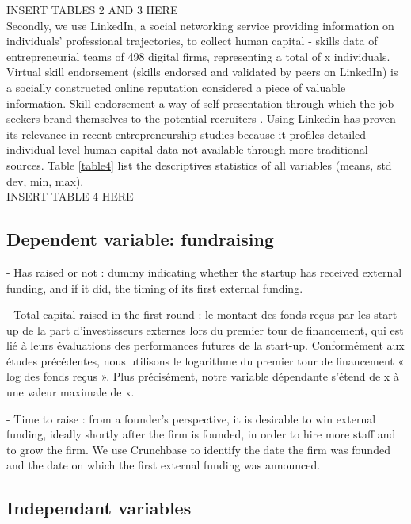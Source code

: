 \documentclass[12pt]{article}
\begin{document}
INSERT TABLES 2 AND 3 HERE \\

Secondly, we use LinkedIn, a social networking service providing information on individuals' professional trajectories, to collect human capital - skills data of entrepreneurial teams of 498 digital firms, representing a total of x individuals. Virtual skill endorsement (skills endorsed and validated by peers on LinkedIn) is a socially constructed online reputation considered a piece of valuable information. Skill endorsement a way of self-presentation through which the job seekers brand themselves to the potential recruiters \citep{rapanta2017linkedin}. Using Linkedin has proven its relevance in recent entrepreneurship studies because it profiles detailed individual-level human capital data not available through more traditional sources. Table \ref{table4} list the descriptives statistics of all variables (means, std dev, min, max). \\

INSERT TABLE 4 HERE \\

\subsection{Dependent variable: fundraising}

- Has raised or not : dummy indicating whether the startup has received external funding, and if it did, the timing of its first external funding.

- Total capital raised in the first round : le montant des fonds reçus par les start-up de la part d'investisseurs externes lors du premier tour de financement, qui est lié à leurs évaluations des performances futures de la start-up. Conformément aux études précédentes, nous utilisons le logarithme du premier tour de financement « log des fonds reçus ». Plus précisément, notre variable dépendante s'étend de x à une valeur maximale de x.

- Time to raise : from a founder’s perspective, it is desirable to win external funding, ideally shortly after the firm is founded, in order to hire more staff and to grow the firm. We use Crunchbase to identify the date the firm was founded and the date on which the first external funding was announced.

\subsection{Independant variables}
\end{document}
